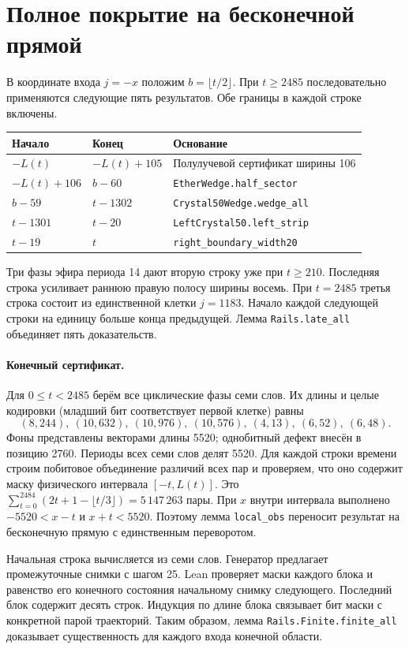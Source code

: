 \documentclass[11pt, a4paper]{article}
\begin{document}
\section{Полное покрытие на бесконечной прямой}
В координате входа $j=-x$ положим $b=\lfloor t/2\rfloor$. При $t\ge2485$ последовательно применяются следующие пять результатов. Обе границы в каждой строке включены.
\begin{center}
\begin{tabular}{lll}
\toprule
Начало & Конец & Основание \\
\midrule
$-L(t)$ & $-L(t)+105$ & Полулучевой сертификат ширины 106 \\
$-L(t)+106$ & $b-60$ & \texttt{EtherWedge.half\_sector} \\
$b-59$ & $t-1302$ & \texttt{Crystal50Wedge.wedge\_all} \\
$t-1301$ & $t-20$ & \texttt{LeftCrystal50.left\_strip} \\
$t-19$ & $t$ & \texttt{right\_boundary\_width20} \\
\bottomrule
\end{tabular}
\end{center}
Три фазы эфира периода 14 дают вторую строку уже при $t\ge210$. Последняя строка усиливает раннюю правую полосу ширины восемь. При $t=2485$ третья строка состоит из единственной клетки $j=1183$. Начало каждой следующей строки на единицу больше конца предыдущей. Лемма \texttt{Rails.late\_all} объединяет пять доказательств.

\paragraph{Конечный сертификат.}
Для $0\le t<2485$ берём все циклические фазы семи слов. Их длины и целые кодировки (младший бит соответствует первой клетке) равны
\[
(8,244),\ (10,632),\ (10,976),\ (10,576),\ (4,13),\ (6,52),\ (6,48).
\]
Фоны представлены векторами длины 5520; однобитный дефект внесён в позицию 2760. Периоды всех семи слов делят 5520. Для каждой строки времени строим побитовое объединение различий всех пар и проверяем, что оно содержит маску физического интервала $[-t,L(t)]$. Это $\sum_{t=0}^{2484}(2t+1-\lfloor t/3\rfloor)=5\,147\,263$ пары. При $x$ внутри интервала выполнено $-5520<x-t$ и $x+t<5520$. Поэтому лемма \texttt{local\_obs} переносит результат на бесконечную прямую с единственным переворотом.

Начальная строка вычисляется из семи слов. Генератор предлагает промежуточные снимки с шагом 25. Lean проверяет маски каждого блока и равенство его конечного состояния начальному снимку следующего. Последний блок содержит десять строк. Индукция по длине блока связывает бит маски с конкретной парой траекторий. Таким образом, лемма \texttt{Rails.Finite.finite\_all} доказывает существенность для каждого входа конечной области.
\end{document}
